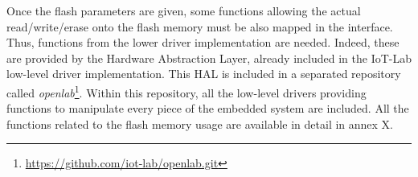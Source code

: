 Once the flash parameters are given, some functions allowing the actual read/write/erase onto the flash memory must be also mapped in the interface.
Thus, functions from the lower driver implementation are needed.
Indeed, these are provided by the Hardware Abstraction Layer, already included in the IoT-Lab low-level driver implementation.
This HAL is included in a separated repository called \textit{openlab}\footnote{\url{https://github.com/iot-lab/openlab.git}}.
Within this repository, all the low-level drivers providing functions to manipulate every piece of the embedded system are included.
All the functions related to the flash memory usage are available in detail in annex X.

